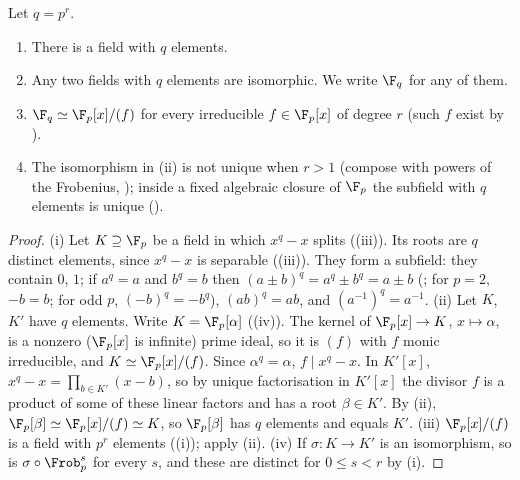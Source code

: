 \begin{theorem}\label{thm:rings:finite-field-exists}
Let $q=p^r$.
\begin{enumerate}[label=(\roman*)]
\item There is a field with $q$ elements.
\item Any two fields with $q$ elements are isomorphic. We write $\F_q$ for any of them.
\item $\F_q\simeq\F_p[x]/(f)$ for every irreducible $f\in\F_p[x]$ of degree $r$ (such $f$ exist by ).
\item The isomorphism in (ii) is not unique when $r>1$ (compose with powers of the Frobenius, ); inside a fixed
algebraic closure of $\F_p$ the subfield with $q$ elements is unique ().
\end{enumerate}
\end{theorem}

\begin{proof}
(i) Let $K\supseteq\F_p$ be a field in which $x^q-x$ splits ((iii)). Its roots are $q$ distinct elements, since
$x^q-x$ is separable ((iii)). They form a subfield: they contain $0$, $1$; if $a^q=a$ and $b^q=b$ then
$(a\pm b)^q=a^q\pm b^q=a\pm b$ (; for $p=2$, $-b=b$; for odd $p$, $(-b)^q=-b^q$), $(ab)^q=ab$, and $(a^{-1})^q=a^{-1}$.
(ii) Let $K$, $K'$ have $q$ elements. Write $K=\F_p[\alpha]$ ((iv)). The kernel of $\F_p[x]\to K$, $x\mapsto\alpha$, is a nonzero
($\F_p[x]$ is infinite) prime ideal, so it is $(f)$ with $f$ monic irreducible, and $K\simeq\F_p[x]/(f)$. Since $\alpha^q=\alpha$, $f\mid x^q-x$. In $K'[x]$,
$x^q-x=\prod_{b\in K'}(x-b)$, so by unique factorisation in $K'[x]$ the divisor $f$ is a product of some of these linear factors and has a
root $\beta\in K'$. By (ii), $\F_p[\beta]\simeq\F_p[x]/(f)\simeq K$, so $\F_p[\beta]$ has $q$ elements and equals $K'$.
(iii) $\F_p[x]/(f)$ is a field with $p^r$ elements ((i)); apply (ii).
(iv) If $\sigma\colon K\to K'$ is an isomorphism, so is $\sigma\circ\Frob_p^s$ for every $s$, and these are distinct for $0\le s<r$ by
(i).
\end{proof}

